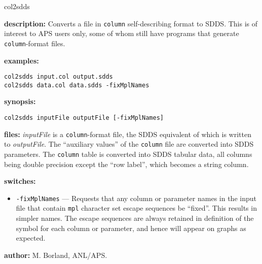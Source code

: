 \begin{sddsprog}{col2sdds}
  \item \textbf{description:}
  Converts a file in \verb|column| self-describing format to SDDS. This is of interest to
  APS users only, some of whom still have programs that generate \verb|column|-format files.
  \item \textbf{examples:}
    \begin{verbatim}
col2sdds input.col output.sdds
col2sdds data.col data.sdds -fixMplNames
    \end{verbatim}
  \item \textbf{synopsis:}
    \begin{verbatim}
col2sdds inputFile outputFile [-fixMplNames]
    \end{verbatim}
  \item \textbf{files:}
  \emph{inputFile} is a \verb|column|-format file, the SDDS equivalent of which is written to
  \emph{outputFile}. The ``auxiliary values'' of the \verb|column| file are converted into SDDS
  parameters. The \verb|column| table is converted into SDDS tabular data, all columns being
  double precision except the ``row label'', which becomes a string column.
  \item \textbf{switches:}
    \begin{itemize}
      \item \verb|-fixMplNames| --- Requests that any column or parameter names in the input file
      that contain \verb|mpl| character set escape sequences be ``fixed''. This results in simpler
      names. The escape sequences are always retained in definition of the symbol for each column
      or parameter, and hence will appear on graphs as expected.
    \end{itemize}
  \item \textbf{author:} M. Borland, ANL/APS.
\end{sddsprog}

